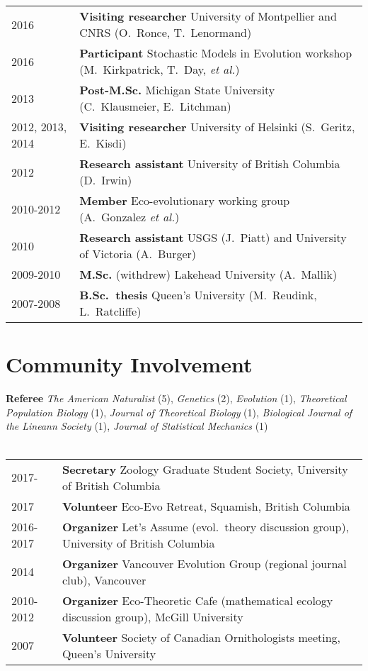 \documentclass[12pt]{article}
\begin{document}
\begin{tabular}{ll}
2016 & \textbf{Visiting researcher} University of Montpellier and CNRS (O.\ Ronce, T.\ Lenormand)\\ 
2016 & \textbf{Participant} Stochastic Models in Evolution workshop (M.\ Kirkpatrick, T.\ Day, \textit{et al.}) \\
2013 &  \textbf{Post-M.Sc.} Michigan State University (C.\ Klausmeier, E.\ Litchman)\\
2012, 2013, 2014 &  \textbf{Visiting researcher} University of Helsinki (S.\ Geritz, E.\ Kisdi)\\ 
2012 &  \textbf{Research assistant} University of British Columbia (D.\ Irwin)\\
2010-2012 &  \textbf{Member} Eco-evolutionary working group (A.\ Gonzalez \textit{et al.})\\
2010 & \textbf{Research assistant} USGS (J.\ Piatt) and University of Victoria (A.\ Burger) \\
2009-2010 & \textbf{M.Sc.} (withdrew) Lakehead University (A.\ Mallik) \\
2007-2008 & \textbf{B.Sc.\ thesis} Queen's University (M.\ Reudink, L.\ Ratcliffe)
\end{tabular}


\section*{Community Involvement}

\noindent \textbf{Referee} \textit{The American Naturalist} (5), \textit{Genetics} (2), \textit{Evolution} (1), \textit{Theoretical Population Biology} (1), \textit{Journal of Theoretical Biology} (1), \textit{Biological Journal of the Lineann Society} (1), \textit{Journal of Statistical Mechanics} (1)\\ 
\\
\begin{tabular}{ll}
2017- & \textbf{Secretary} Zoology Graduate Student Society, University of British Columbia \\
2017 & \textbf{Volunteer} Eco-Evo Retreat, Squamish, British Columbia \\
2016-2017 & \textbf{Organizer} Let's Assume (evol.\ theory discussion group), University of British Columbia \\
2014 & \textbf{Organizer} Vancouver Evolution Group (regional journal club), Vancouver \\
2010-2012 & \textbf{Organizer} Eco-Theoretic Cafe (mathematical ecology discussion group), McGill University \\
2007 & \textbf{Volunteer} Society of Canadian Ornithologists meeting,  Queen's University
\end{tabular}
\end{document}
